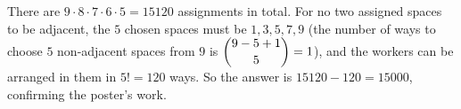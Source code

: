 There are $9\cdot8\cdot7\cdot6\cdot5=15120$ assignments in total. For no two assigned spaces to be adjacent, the $5$ chosen spaces must be $1,3,5,7,9$ (the number of ways to choose $5$ non-adjacent spaces from $9$ is $\dbinom{9-5+1}{5}=1$), and the workers can be arranged in them in $5!=120$ ways. So the answer is $15120-120=\boxed{15000}$, confirming the poster's work.
